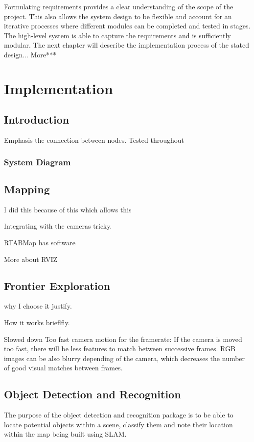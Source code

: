 \documentclass{mproj}
\begin{document}
Formulating requirements provides a clear understanding of the scope of the project. This also allows the system design to be flexible and account for an iterative processes where different modules can be completed and tested in stages. The high-level system is able to capture the requirements and is sufficiently modular. The next chapter will describe the implementation process of the stated design... More***  


\chapter{Implementation}
\section{Introduction}

Emphasis the connection between nodes. Tested throughout

\subsection{System Diagram}

\section{Mapping}

I did this because of this which allows this

Integrating with the cameras tricky.

RTABMap has software

More about RVIZ

\section{Frontier Exploration}

why I choose it justify.

How it works brieflfly.

Slowed down
Too fast camera motion for the framerate: If the camera is moved too fast, there will be less features to match between successive frames. RGB images can be also blurry depending of the camera, which decreases the number of good visual matches between frames.
\section{Object Detection and Recognition}
The purpose of the object detection and recognition package is to be able to locate potential objects within a scene, classify them and note their location within the map being built using SLAM.
\end{document}
